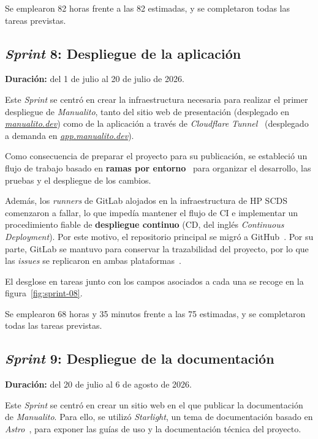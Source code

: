 Se emplearon 82 horas frente a las 82 estimadas, y se completaron todas
las tareas previstas.

\subsection{\textit{Sprint} 8: Despliegue de la aplicación}
\textbf{Duración:} del 1 de julio al 20 de julio de 2026.

Este \textit{Sprint} se centró en crear la infraestructura necesaria para
realizar el primer despliegue de \textit{Manualito}, tanto del sitio web de
presentación (desplegado en \href{https://manualito.dev/}{\textit{manualito.dev}})
como de la aplicación a través de \textit{Cloudflare
Tunnel}~\cite{cloudflare_tunnel}
(desplegado a demanda en \href{https://app.manualito.dev/}{\textit{app.manualito.dev}}).

Como consecuencia de preparar el proyecto para su publicación, se estableció un
flujo de trabajo basado en \textbf{ramas por entorno}~\cite{gitlab_branch_per_environment}
para organizar el desarrollo, las pruebas y el despliegue de los cambios.

Además, los \textit{runners} de GitLab alojados en la infraestructura de HP SCDS
comenzaron a fallar, lo que impedía mantener el flujo de \ac{CI} e implementar un
procedimiento fiable de \textbf{despliegue continuo} (\acs{CD}, del inglés
\textit{Continuous Deployment}). Por este motivo, el repositorio
principal se migró a GitHub~\cite{manualito_github}. Por su parte, GitLab se
mantuvo para conservar la trazabilidad del proyecto, por lo que las
\textit{issues} se replicaron en ambas plataformas~\cite{manualito_gitlab}.

El desglose en tareas junto con los campos asociados a cada una se
recoge en la figura~\ref{fig:sprint-08}.


Se emplearon 68 horas y 35 minutos frente a las 75 estimadas, y se
completaron todas las tareas previstas.

\subsection{\textit{Sprint} 9: Despliegue de la documentación}
\textbf{Duración:} del 20 de julio al 6 de agosto de 2026.

Este \textit{Sprint} se centró en crear un sitio web en el que publicar la
documentación de \textit{Manualito}. Para ello, se utilizó \textit{Starlight},
un tema de documentación basado en \textit{Astro}~\cite{starlight_documentation}, para exponer las guías de uso y la documentación técnica del proyecto.

